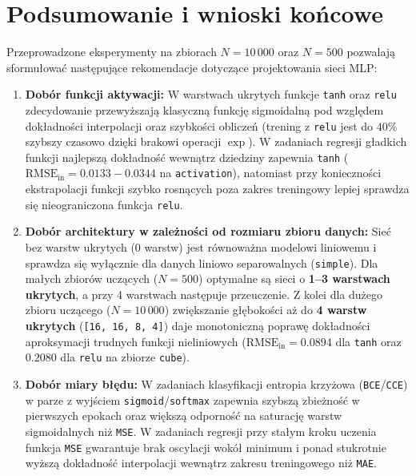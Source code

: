 \documentclass{article}
\begin{document}
\newpage

\section{Podsumowanie i wnioski końcowe}

Przeprowadzone eksperymenty na zbiorach $N = 10\,000$ oraz $N = 500$ pozwalają sformułować następujące rekomendacje dotyczące projektowania sieci MLP:
\begin{enumerate}
    \item \textbf{Dobór funkcji aktywacji:} W warstwach ukrytych funkcje \texttt{tanh} oraz \texttt{relu} zdecydowanie przewyższają klasyczną funkcję sigmoidalną pod względem dokładności interpolacji oraz szybkości obliczeń (trening z \texttt{relu} jest do $40\%$ szybszy czasowo dzięki brakowi operacji $\exp$). W zadaniach regresji gładkich funkcji najlepszą dokładność wewnątrz dziedziny zapewnia \texttt{tanh} ($\text{RMSE}_{\text{in}} = 0.0133 - 0.0344$ na \texttt{activation}), natomiast przy konieczności ekstrapolacji funkcji szybko rosnących poza zakres treningowy lepiej sprawdza się nieograniczona funkcja \texttt{relu}.
    \item \textbf{Dobór architektury w zależności od rozmiaru zbioru danych:} Sieć bez warstw ukrytych (0 warstw) jest równoważna modelowi liniowemu i sprawdza się wyłącznie dla danych liniowo separowalnych (\texttt{simple}). Dla małych zbiorów uczących ($N = 500$) optymalne są sieci o \textbf{1--3 warstwach ukrytych}, a przy 4 warstwach następuje przeuczenie. Z kolei dla dużego zbioru uczącego ($N = 10\,000$) zwiększanie głębokości aż do \textbf{4 warstw ukrytych} (\texttt{[16, 16, 8, 4]}) daje monotoniczną poprawę dokładności aproksymacji trudnych funkcji nieliniowych ($\text{RMSE}_{\text{in}} = 0.0894$ dla \texttt{tanh} oraz $0.2080$ dla \texttt{relu} na zbiorze \texttt{cube}).
    \item \textbf{Dobór miary błędu:} W zadaniach klasyfikacji entropia krzyżowa (\texttt{BCE}/\texttt{CCE}) w parze z wyjściem \texttt{sigmoid}/\texttt{softmax} zapewnia szybszą zbieżność w pierwszych epokach oraz większą odporność na saturację warstw sigmoidalnych niż \texttt{MSE}. W zadaniach regresji przy stałym kroku uczenia funkcja \texttt{MSE} gwarantuje brak oscylacji wokół minimum i ponad stukrotnie wyższą dokładność interpolacji wewnątrz zakresu treningowego niż \texttt{MAE}.
\end{enumerate}
\end{document}
